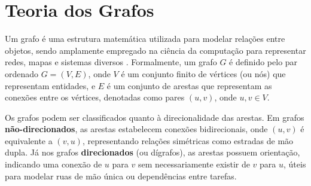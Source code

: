 


\section{Teoria dos Grafos}

Um grafo é uma estrutura matemática utilizada para modelar relações entre objetos, sendo 
amplamente empregado na ciência da computação para representar redes, mapas e sistemas diversos 
\cite{CORMEN2012}. Formalmente, um grafo $G$ é definido pelo par ordenado $G = (V, E)$, onde 
$V$ é um conjunto finito de vértices (ou nós) que representam entidades, e $E$ é um conjunto 
de arestas que representam as conexões entre os vértices, denotadas como pares $(u, v)$, 
onde $u, v \in V$.

Os grafos podem ser classificados quanto à direcionalidade das arestas. Em grafos 
\textbf{não-direcionados}, as arestas estabelecem conexões bidirecionais, onde $(u, v)$ 
é equivalente a $(v, u)$, representando relações simétricas como estradas de mão dupla. 
Já nos grafos \textbf{direcionados} (ou dígrafos), as arestas possuem orientação, 
indicando uma conexão de $u$ para $v$ sem necessariamente existir de $v$ para $u$, 
úteis para modelar ruas de mão única ou dependências entre tarefas.


